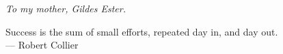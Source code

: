 
\large
\begin{flushleft}
    \noindent\textit{To my mother, Gildes Ester.}
\end{flushleft}

\vspace*{5cm}

\begin{flushright}
    \normalsize
    Success is the sum of small efforts, repeated day in, and day out. \\ --- Robert Collier
\end{flushright}
